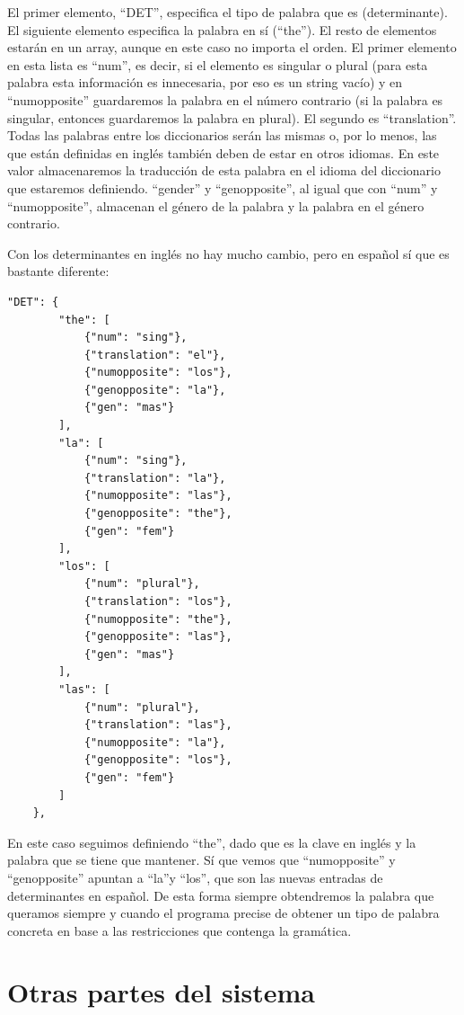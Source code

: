 El primer elemento, ``DET'', especifica el tipo de palabra que es (determinante). El siguiente elemento especifica la palabra en sí (``the''). El resto de elementos estarán en un array, aunque en este caso no importa el orden. El primer elemento en esta lista es ``num'', es decir, si el elemento es singular o plural (para esta palabra esta información es innecesaria, por eso es un string vacío) y en ``numopposite'' guardaremos la palabra en el número contrario (si la palabra es singular, entonces guardaremos la palabra en plural).
El segundo es ``translation''. Todas las palabras entre los diccionarios serán las mismas o, por lo menos, las que están definidas en inglés también deben de estar en otros idiomas. En este valor almacenaremos la traducción de esta palabra en el idioma del diccionario que estaremos definiendo.
``gender'' y ``genopposite'', al igual que con ``num'' y ``numopposite'', almacenan el género de la palabra y la palabra en el género contrario.

Con los determinantes en inglés no hay mucho cambio, pero en español sí que es bastante diferente:

\begin{lstlisting}[style=json]
"DET": {
        "the": [
            {"num": "sing"},
            {"translation": "el"},
            {"numopposite": "los"},
            {"genopposite": "la"},
            {"gen": "mas"}
        ],
        "la": [
            {"num": "sing"},
            {"translation": "la"},
            {"numopposite": "las"},
            {"genopposite": "the"},
            {"gen": "fem"}
        ],
        "los": [
            {"num": "plural"},
            {"translation": "los"},
            {"numopposite": "the"},
            {"genopposite": "las"},
            {"gen": "mas"}
        ],
        "las": [
            {"num": "plural"},
            {"translation": "las"},
            {"numopposite": "la"},
            {"genopposite": "los"},
            {"gen": "fem"}
        ]
    },
\end{lstlisting}

En este caso seguimos definiendo ``the'', dado que es la clave en inglés y la palabra que se tiene que mantener. Sí que vemos que ``numopposite'' y ``genopposite'' apuntan a ``la''y ``los'', que son las nuevas entradas de determinantes en español. De esta forma siempre obtendremos la palabra que queramos siempre y cuando el programa precise de obtener un tipo de palabra concreta en base a las restricciones que contenga la gramática.

\section{Otras partes del sistema}


